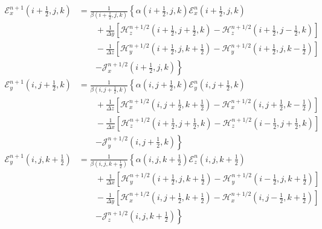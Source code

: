 \documentclass{article}
\numberwithin{equation}{section}
\begin{document}
\begin{align}
    \label{eq:eq580}
    \mathcal{E}_x^{n+1}\left(i+\frac{1}{2},j,k\right)&=\frac{1}{\beta\left(i+\frac{1}{2},j,k\right)}\left\{\alpha\left(i+\frac{1}{2},j,k\right)\mathcal{E}_x^{n}\left(i+\frac{1}{2},j,k\right)\right. \nonumber \\
                                                     &\qquad+\frac{1}{\Delta y}\left[\mathcal{H}_z^{n+1/2}\left(i+\frac{1}{2},j+\frac{1}{2},k\right)-\mathcal{H}_z^{n+1/2}\left(i+\frac{1}{2},j-\frac{1}{2},k\right)\right] \nonumber \\
                                                     &\qquad-\frac{1}{\Delta z}\left[\mathcal{H}_y^{n+1/2}\left(i+\frac{1}{2},j,k+\frac{1}{2}\right)-\mathcal{H}_y^{n+1/2}\left(i+\frac{1}{2},j,k-\frac{1}{2}\right)\right] \nonumber \\
                                                     &\qquad\left.-\mathcal{J}_x^{n+1/2}\left(i+\frac{1}{2},j,k\right)\right\} \\
    \label{eq:eq581}
    \mathcal{E}_y^{n+1}\left(i,j+\frac{1}{2},k\right)&=\frac{1}{\beta\left(i,j+\frac{1}{2},k\right)}\left\{\alpha\left(i,j+\frac{1}{2},k\right)\mathcal{E}_y^{n}\left(i,j+\frac{1}{2},k\right)\right. \nonumber \\
                                                     &\qquad+\frac{1}{\Delta z}\left[\mathcal{H}_x^{n+1/2}\left(i,j+\frac{1}{2},k+\frac{1}{2}\right)-\mathcal{H}_x^{n+1/2}\left(i,j+\frac{1}{2},k-\frac{1}{2}\right)\right] \nonumber \\
                                                     &\qquad-\frac{1}{\Delta x}\left[\mathcal{H}_z^{n+1/2}\left(i+\frac{1}{2},j+\frac{1}{2},k\right)-\mathcal{H}_z^{n+1/2}\left(i-\frac{1}{2},j+\frac{1}{2},k\right)\right] \nonumber \\
                                                     &\qquad\left.-\mathcal{J}_y^{n+1/2}\left(i,j+\frac{1}{2},k\right)\right\} \\
    \label{eq:eq582}
    \mathcal{E}_y^{n+1}\left(i,j,k+\frac{1}{2}\right)&=\frac{1}{\beta\left(i,j,k+\frac{1}{2}\right)}\left\{\alpha\left(i,j,k+\frac{1}{2}\right)\mathcal{E}_z^{n}\left(i,j,k+\frac{1}{2}\right)\right. \nonumber \\
                                                     &\qquad+\frac{1}{\Delta x}\left[\mathcal{H}_y^{n+1/2}\left(i+\frac{1}{2},j,k+\frac{1}{2}\right)-\mathcal{H}_y^{n+1/2}\left(i-\frac{1}{2},j,k+\frac{1}{2}\right)\right] \nonumber \\
                                                     &\qquad-\frac{1}{\Delta y}\left[\mathcal{H}_x^{n+1/2}\left(i,j+\frac{1}{2},k+\frac{1}{2}\right)-\mathcal{H}_x^{n+1/2}\left(i,j-\frac{1}{2},k+\frac{1}{2}\right)\right] \nonumber \\
                                                     &\qquad\left.-\mathcal{J}_z^{n+1/2}\left(i,j,k+\frac{1}{2}\right)\right\}
\end{align}
\end{document}
